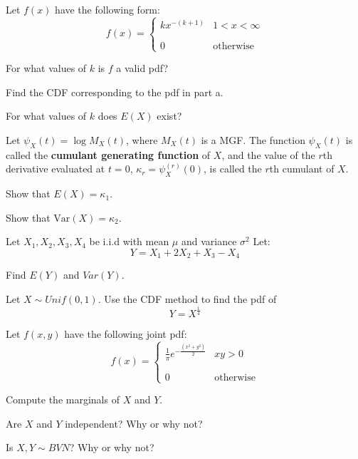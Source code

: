 \documentclass{article}
\newcommand{\pdf}[2]{\left\{\begin{matrix}
{#1} & {#2}\\\\\\0&\textrm{otherwise}
\end{matrix}\right.}
\begin{document}
\begin{problem}{15}
Let $f(x)$ have the following form:
$$f(x) = \pdf{kx^{-(k+1)}}{1<x<\infty}$$

\vspace{1pc}

For what values of $k$ is $f$ a valid pdf?

\vspace{1pc}

Find the CDF corresponding to the pdf in part a.

\vspace{1pc}

For what values of $k$ does $E(X)$ exist?
\end{problem}


\begin{problem}{10}
Let $\psi_X(t)=\log M_X(t)$, where $M_X(t)$ is a MGF. The function $\psi_X(t)$ is called the \textbf{cumulant generating function} of $X$, and the value of the $r$th derivative evaluated at $t=0$, $\kappa_r=\psi^{(r)}_X(0)$, is called the $r$th cumulant of $X$.\\


Show that $E(X)=\kappa_1$.

\vspace{1pc}


Show that $\text{Var}(X)=\kappa_2$.

\vspace{1pc}

\end{problem}

\begin{problem}{10}
Let $X_1,X_2,X_3,X_4$ be i.i.d with mean $\mu$ and variance $\sigma^2$ Let:
$$Y = X_1 + 2X_2 +X_3 - X_4$$

Find $E(Y)$ and $Var(Y)$.
\end{problem}

\vspace{1pc}

\begin{problem}{10}
Let $X\sim Unif(0,1)$. Use the CDF method to find the pdf of 
$$Y=X^{\frac14}$$  

\end{problem}

\begin{problem}{15}
Let $f(x,y)$ have the following joint pdf:
$$f(x) = \pdf{\frac1\pi e^{-\frac{(x^2+y^2)}2}}{xy>0}$$

\vspace{1pc}

Compute the marginals of $X$ and $Y$.

\vspace{1pc}

Are $X$ and $Y$ independent? Why or why not?

\vspace{1pc}

Is $X,Y\sim BVN$? Why or why not?
\end{problem}
\end{document}
